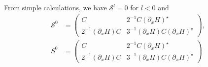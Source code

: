 \documentclass[a4paper,11pt]{jsarticle}
\begin{document}
From simple calculations, we have $\mathscr{S}^l = 0$ for $l <0$ and
\begin{align}
    \mathscr{S}^0 & = \begin{pmatrix}
        C  & 2^{-1} C(\partial_x H)^{\star} \\ 2^{-1} (\partial_x H )C& 3^{-1}( \partial_x H)C( \partial_x H)^{\star}
    \end{pmatrix},\\  S^0 &= \begin{pmatrix}
        C  & 2^{-1} C(\partial_x H)^{\star} \\ 2^{-1} (\partial_x H )C& 3^{-1}( \partial_x H)C( \partial_x H)^{\star}
    \end{pmatrix}
\end{align}
\end{document}
